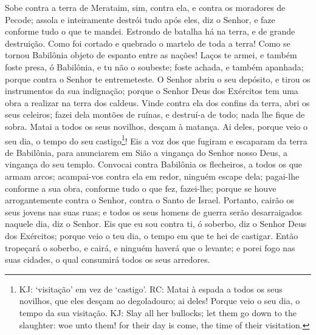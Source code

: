 Sobe contra a terra de Merataim, sim, contra ela, e contra os
moradores de Pecode; assola e inteiramente destrói tudo após eles,
diz o Senhor, e faze conforme tudo o que te mandei. Estrondo
de batalha há na terra, e de grande destruição. Como foi
cortado e quebrado o martelo de toda a terra! Como se tornou
Babilônia objeto de espanto entre as nações! Laços te armei,
e também foste presa, ó Babilônia, e tu não o soubeste; foste
achada, e também apanhada; porque contra o Senhor te entremeteste.
O Senhor abriu o seu depósito, e tirou os instrumentos da sua
indignação; porque o Senhor Deus dos Exércitos tem uma obra a
realizar na terra dos caldeus. Vinde contra ela dos confins
da terra, abri os seus celeiros; fazei dela montões de ruínas, e
destruí-a de todo; nada lhe fique de sobra. Matai a todos os
seus novilhos, desçam à matança. Ai deles, porque veio o seu dia, o
tempo do seu castigo\footnote{KJ: `visitação' em vez de `castigo'.
RC: Matai à espada a todos os seus novilhos, que eles desçam ao
degoladouro; ai deles! Porque veio o seu dia, o tempo da sua
visitação. KJ: Slay all her bullocks; let them go down to the
slaughter: woe unto them! for their day is come, the time of their
visitation.}! Eis a voz dos que fugiram e escaparam da terra
de Babilônia, para anunciarem em Sião a vingança do Senhor nosso
Deus, a vingança do seu templo. Convocai contra Babilônia os
flecheiros, a todos os que armam arcos; acampai-vos contra ela em
redor, ninguém escape dela; pagai-lhe conforme a sua obra, conforme
tudo o que fez, fazei-lhe; porque se houve arrogantemente contra o
Senhor, contra o Santo de Israel. Portanto, cairão os seus
jovens nas suas ruas; e todos os seus homens de guerra serão
desarraigados naquele dia, diz o Senhor. Eis que eu sou
contra ti, ó soberbo, diz o Senhor Deus dos Exércitos; porque veio o
teu dia, o tempo em que te hei de castigar. Então tropeçará o
soberbo, e cairá, e ninguém haverá que o levante; e porei fogo nas
suas cidades, o qual consumirá todos os seus arredores.

